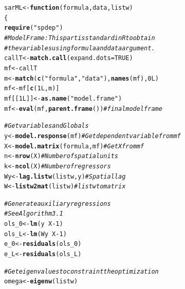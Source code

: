 \documentclass[english,12pt]{book}\usepackage[]{graphicx}\usepackage[]{xcolor}
\makeatletter
\newcommand{\hlnum}[1]{\textcolor[rgb]{0.686,0.059,0.569}{#1}}%
\newcommand{\hlstr}[1]{\textcolor[rgb]{0.192,0.494,0.8}{#1}}%
\newcommand{\hlcom}[1]{\textcolor[rgb]{0.678,0.584,0.686}{\textit{#1}}}%
\newcommand{\hlopt}[1]{\textcolor[rgb]{0,0,0}{#1}}%
\newcommand{\hlstd}[1]{\textcolor[rgb]{0.345,0.345,0.345}{#1}}%
\newcommand{\hlkwa}[1]{\textcolor[rgb]{0.161,0.373,0.58}{\textbf{#1}}}%
\newcommand{\hlkwb}[1]{\textcolor[rgb]{0.69,0.353,0.396}{#1}}%
\newcommand{\hlkwc}[1]{\textcolor[rgb]{0.333,0.667,0.333}{#1}}%
\newcommand{\hlkwd}[1]{\textcolor[rgb]{0.737,0.353,0.396}{\textbf{#1}}}%
\newenvironment{kframe}{%
 \def\at@end@of@kframe{}%
 \ifinner\ifhmode%
  \def\at@end@of@kframe{\end{minipage}}%
  \begin{minipage}{\columnwidth}%
 \fi\fi%
 \def\FrameCommand##1{\hskip\@totalleftmargin \hskip-\fboxsep
 \colorbox{shadecolor}{##1}\hskip-\fboxsep
     \hskip-\linewidth \hskip-\@totalleftmargin \hskip\columnwidth}%
 \MakeFramed {\advance\hsize-\width
   \@totalleftmargin\z@ \linewidth\hsize
   \@setminipage}}%
 {\par\unskip\endMakeFramed%
 \at@end@of@kframe}
\newenvironment{knitrout}{}{} %
\makeatother
\begin{document}
\begin{knitrout}
\color{fgcolor}\begin{kframe}
\begin{alltt}
\hlstd{sarML} \hlkwb{<-} \hlkwa{function}\hlstd{(}\hlkwc{formula}\hlstd{,} \hlkwc{data}\hlstd{,} \hlkwc{listw}\hlstd{)}
\hlstd{\{}
  \hlkwd{require}\hlstd{(}\hlstr{"spdep"}\hlstd{)}
  \hlcom{# Model Frame: This part is standard in R to obtain}
  \hlcom{# the variables using formula and data argument.}
  \hlstd{callT} \hlkwb{<-} \hlkwd{match.call}\hlstd{(}\hlkwc{expand.dots} \hlstd{=} \hlnum{TRUE}\hlstd{)}
  \hlstd{mf} \hlkwb{<-} \hlstd{callT}
  \hlstd{m}  \hlkwb{<-} \hlkwd{match}\hlstd{(}\hlkwd{c}\hlstd{(}\hlstr{"formula"}\hlstd{,} \hlstr{"data"}\hlstd{),} \hlkwd{names}\hlstd{(mf),} \hlnum{0L}\hlstd{)}
  \hlstd{mf} \hlkwb{<-} \hlstd{mf[}\hlkwd{c}\hlstd{(}\hlnum{1L}\hlstd{, m)]}
  \hlstd{mf[[}\hlnum{1L}\hlstd{]]} \hlkwb{<-} \hlkwd{as.name}\hlstd{(}\hlstr{"model.frame"}\hlstd{)}
  \hlstd{mf} \hlkwb{<-} \hlkwd{eval}\hlstd{(mf,} \hlkwd{parent.frame}\hlstd{())} \hlcom{# final model frame}

  \hlcom{# Get variables and Globals}
  \hlstd{y}  \hlkwb{<-} \hlkwd{model.response}\hlstd{(mf)}        \hlcom{# Get dependent variable from mf}
  \hlstd{X}  \hlkwb{<-} \hlkwd{model.matrix}\hlstd{(formula, mf)} \hlcom{# Get X from mf}
  \hlstd{n}  \hlkwb{<-} \hlkwd{nrow}\hlstd{(X)}                   \hlcom{# Number of spatial units}
  \hlstd{k}  \hlkwb{<-} \hlkwd{ncol}\hlstd{(X)}                   \hlcom{# Number of regressors}
  \hlstd{Wy} \hlkwb{<-} \hlkwd{lag.listw}\hlstd{(listw, y)}       \hlcom{# Spatial lag}
  \hlstd{W}  \hlkwb{<-} \hlkwd{listw2mat}\hlstd{(listw)}          \hlcom{# listw to matrix}

  \hlcom{# Generate auxiliary regressions }
  \hlcom{# See Algorithm 3.1}
  \hlstd{ols_0} \hlkwb{<-} \hlkwd{lm}\hlstd{(y} \hlopt{~} \hlstd{X} \hlopt{-} \hlnum{1}\hlstd{)}
  \hlstd{ols_L} \hlkwb{<-} \hlkwd{lm}\hlstd{(Wy} \hlopt{~} \hlstd{X} \hlopt{-} \hlnum{1}\hlstd{)}
  \hlstd{e_0}   \hlkwb{<-} \hlkwd{residuals}\hlstd{(ols_0)}
  \hlstd{e_L}   \hlkwb{<-} \hlkwd{residuals}\hlstd{(ols_L)}

  \hlcom{# Get eigenvalues to constraint the optimization}
  \hlstd{omega} \hlkwb{<-} \hlkwd{eigenw}\hlstd{(listw)}


\end{alltt}
\end{kframe}
\end{knitrout}
\end{document}
